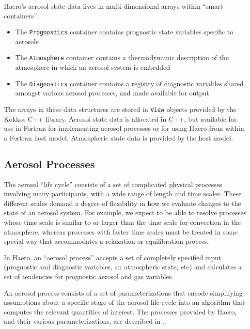 Haero's aerosol state data lives in multi-dimensional arrays within ``smart
containers'':

\begin{itemize}
  \item The \texttt{Prognostics} container contains prognostic state variables
        specific to aerosols
  \item The \texttt{Atmosphere} container contains a thermodynamic description
        of the atmosphere in which an aerosol system is embedded
  \item The \texttt{Diagnostics} container contains a registry of diagnostic
        variables shared amongst various aerosol processes, and made available
        for output
\end{itemize}

The arrays in these data structures are stored in \texttt{View} objects provided
by the Kokkos C++ library. Aerosol state data is allocated in C++, but available
for use in Fortran for implementing aerosol processes or for using Haero
from within a Fortran host model. Atmospheric state data is provided by the
host model.

\subsection{Aerosol Processes}

The aerosol ``life cycle'' consists of a set of complicated physical processes
involving many participants, with a wide range of length and time scales. These
different scales demand a degree of flexibility in how we evaluate changes to
the state of an aerosol system. For example, we expect to be able to resolve
processes whose time scale is similar to or larger than the time scale for
convection in the atmosphere, whereas processes with faster time scales must be
treated in some special way that accommodates a relaxation or equilibration
process.

In Haero, an ``aerosol process'' accepts a set of completely specified input
(prognostic and diagnostic variables, an atmospheric state, etc) and calculates
a set of tendencies for prognostic aerosol and gas variables.

An aerosol process consists of a set of parameterizations that encode simplifying
assumptions about a specific stage of the aerosol life cycle into an algorithm
that computes the relevant quantities of interest. The processes provided by
Haero, and their various parameterizations, are described in .

